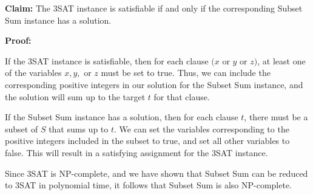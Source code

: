 \textbf{Claim:} The 3SAT instance is satisfiable if and only if the corresponding Subset Sum instance has a solution.

\textbf{Proof:}

If the 3SAT instance is satisfiable, then for each clause $(x$ or $y$ or $z)$, at least one of the variables $x, y,$ or $z$ must be set to true. Thus, we can include the corresponding positive integers in our solution for the Subset Sum instance, and the solution will sum up to the target $t$ for that clause.

If the Subset Sum instance has a solution, then for each clause $t$, there must be a subset of $S$ that sums up to $t$. We can set the variables corresponding to the positive integers included in the subset to true, and set all other variables to false. This will result in a satisfying assignment for the 3SAT instance.

Since 3SAT is NP-complete, and we have shown that Subset Sum can be reduced to 3SAT in polynomial time, it follows that Subset Sum is also NP-complete.
